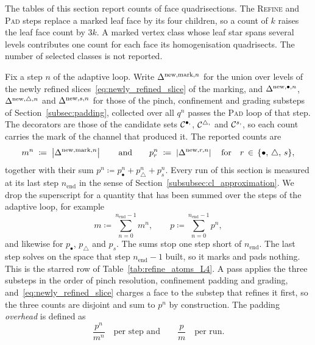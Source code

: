 \documentclass[a4paper, 12pt]{article}
\makeatletter
\DeclareRobustCommand{\candV}[1][]{\mathcal{C}^{\bullet\ifx\@empty#1\@empty\else,#1\fi}}
\DeclareRobustCommand{\candF}[1][]{\mathcal{C}^{\triangle\ifx\@empty#1\@empty\else,#1\fi}}
\DeclareRobustCommand{\candC}[1][]{\mathcal{C}^{s\ifx\@empty#1\@empty\else,#1\fi}}
\newcommand{\laststep}{{n_{\mathrm{end}}}}                      %
\newcommand{\totalDoFs}[1]{N\!\left(#1\right)}
\DeclareRobustCommand{\simplexsubsetNewAll}[1][]{\Delta^{\mathrm{new}\ifx\@empty#1\@empty\else,#1\fi}}
\newcommand{\vvert}[1]{\left\vert #1 \right\vert}
\theoremstyle{definition}
\theoremstyle{plain}
\numberwithin{equation}{section}
\makeatother
\begin{document}
The tables of this section report counts of face quadrisections. The \textsc{Refine} and \textsc{Pad} steps replace a marked leaf face by its four children, so a count of $k$ raises the leaf face count by $3k$. A marked vertex class whose leaf star spans several levels contributes one count for each face its homogenisation quadrisects. The number of selected classes is not reported.

Fix a step $n$ of the adaptive loop. Write $\simplexsubsetNewAll[\mathrm{mark},n]$ for the union over levels of the newly refined slices~\eqref{eq:newly_refined_slice} of the marking, and $\simplexsubsetNewAll[\bullet,n]$, $\simplexsubsetNewAll[\triangle,n]$ and $\simplexsubsetNewAll[s,n]$ for those of the pinch, confinement and grading substeps of Section~\ref{subsec:padding}, collected over all $q^n$ passes the \textsc{Pad} loop of that step. The decorators are those of the candidate sets $\candV$, $\candF$ and $\candC$, so each count carries the mark of the channel that produced it. The reported counts are
\begin{equation}
    \label{eq:refine_counts}
    m^n \; \coloneq \; \vvert{\simplexsubsetNewAll[\mathrm{mark},n]}
    \qquad\text{and}\qquad
    p^n_r \; \coloneq \; \vvert{\simplexsubsetNewAll[r,n]}
    \quad\text{for}\quad
    r \, \in \, \{ \bullet, \, \triangle, \, s \} ,
\end{equation}
together with their sum $p^n \coloneq p^n_\bullet + p^n_\triangle + p^n_s$. Every run of this section is measured at its last step $\laststep$ in the sense of Section~\ref{subsubsec:cl_approximation}. We drop the superscript for a quantity that has been summed over the steps of the adaptive loop, for example
\begin{equation}
    \label{eq:whole_run_sum}
    m \coloneq \sum\limits_{n = 0}^{\laststep - 1} m^n, \qquad p \coloneq \sum\limits_{n = 0}^{\laststep - 1} p^n,
\end{equation}
and likewise for $p_\bullet$, $p_\triangle$ and $p_s$. The sums stop one step short of $\laststep$. The last step solves on the space that step $\laststep - 1$ built, so it marks and pads nothing. This is the starred row of Table~\ref{tab:refine_atoms_L4}. A pass applies the three substeps in the order of pinch resolution, confinement padding and grading, and~\eqref{eq:newly_refined_slice} charges a face to the substep that refines it first, so the three counts are disjoint and sum to $p^n$ by construction. The padding \emph{overhead} is defined as
\begin{equation}
    \label{eq:padding_overhead}
    \frac{p^n}{m^n} \quad \text{per step and} \qquad \frac{p}{m} \quad \text{per run}.
\end{equation}
\end{document}
